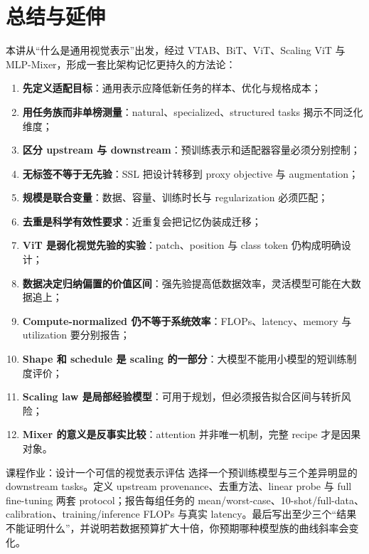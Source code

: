 \section{总结与延伸}

本讲从“什么是通用视觉表示”出发，经过 VTAB、BiT、ViT、Scaling ViT 与 MLP-Mixer，形成一套比架构记忆更持久的方法论：

\begin{enumerate}
  \item \textbf{先定义适配目标}：通用表示应降低新任务的样本、优化与规格成本；
  \item \textbf{用任务族而非单榜测量}：natural、specialized、structured tasks 揭示不同泛化维度；
  \item \textbf{区分 upstream 与 downstream}：预训练表示和适配器容量必须分别控制；
  \item \textbf{无标签不等于无先验}：SSL 把设计转移到 proxy objective 与 augmentation；
  \item \textbf{规模是联合变量}：数据、容量、训练时长与 regularization 必须匹配；
  \item \textbf{去重是科学有效性要求}：近重复会把记忆伪装成迁移；
  \item \textbf{ViT 是弱化视觉先验的实验}：patch、position 与 class token 仍构成明确设计；
  \item \textbf{数据决定归纳偏置的价值区间}：强先验提高低数据效率，灵活模型可能在大数据追上；
  \item \textbf{Compute-normalized 仍不等于系统效率}：FLOPs、latency、memory 与 utilization 要分别报告；
  \item \textbf{Shape 和 schedule 是 scaling 的一部分}：大模型不能用小模型的短训练制度评价；
  \item \textbf{Scaling law 是局部经验模型}：可用于规划，但必须报告拟合区间与转折风险；
  \item \textbf{Mixer 的意义是反事实比较}：attention 并非唯一机制，完整 recipe 才是因果对象。
\end{enumerate}

\begin{importantbox}{课程作业：设计一个可信的视觉表示评估}
选择一个预训练模型与三个差异明显的 downstream tasks。定义 upstream provenance、去重方法、linear probe 与 full fine-tuning 两套 protocol；报告每组任务的 mean/worst-case、10-shot/full-data、calibration、training/inference FLOPs 与真实 latency。最后写出至少三个“结果不能证明什么”，并说明若数据预算扩大十倍，你预期哪种模型族的曲线斜率会变化。
\end{importantbox}

